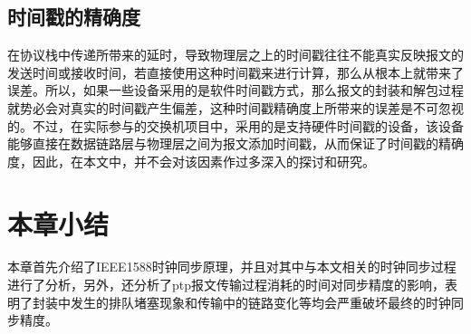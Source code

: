 \subsection{时间戳的精确度}
\label{sec:1588_problem_2}
在协议栈中传递所带来的延时，导致物理层之上的时间戳往往不能真实反映报文的发送时间或接收时间，若直接使用这种时间戳来进行计算，那么从根本上就带来了误差\supercite{53}。所以，如果一些设备采用的是软件时间戳方式，那么报文的封装和解包过程就势必会对真实的时间戳产生偏差，这种时间戳精确度上所带来的误差是不可忽视的。不过，在实际参与的交换机项目中，采用的是支持硬件时间戳的设备，该设备能够直接在数据链路层与物理层之间为报文添加时间戳，从而保证了时间戳的精确度，因此，在本文中，并不会对该因素作过多深入的探讨和研究。

\section{本章小结}
本章首先介绍了IEEE1588时钟同步原理，并且对其中与本文相关的时钟同步过程进行了分析，另外，还分析了ptp报文传输过程消耗的时间对同步精度的影响，表明了封装中发生的排队堵塞现象和传输中的链路变化等均会严重破坏最终的时钟同步精度。



